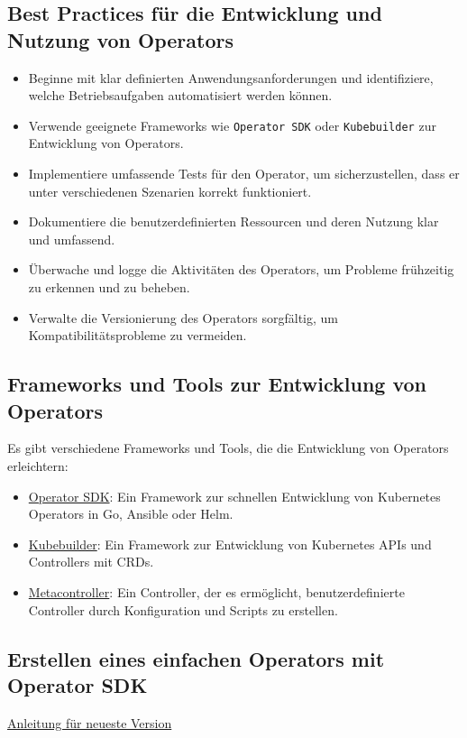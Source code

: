 \subsection{Best Practices für die Entwicklung und Nutzung von Operators}
\begin{itemize}
    \item Beginne mit klar definierten Anwendungsanforderungen und identifiziere, welche Betriebsaufgaben automatisiert werden können.
    \item Verwende geeignete Frameworks wie \texttt{Operator SDK} oder \texttt{Kubebuilder} zur Entwicklung von Operators.
    \item Implementiere umfassende Tests für den Operator, um sicherzustellen, dass er unter verschiedenen Szenarien korrekt funktioniert.
    \item Dokumentiere die benutzerdefinierten Ressourcen und deren Nutzung klar und umfassend.
    \item Überwache und logge die Aktivitäten des Operators, um Probleme frühzeitig zu erkennen und zu beheben.
    \item Verwalte die Versionierung des Operators sorgfältig, um Kompatibilitätsprobleme zu vermeiden.
\end{itemize}

\subsection{Frameworks und Tools zur Entwicklung von Operators}
Es gibt verschiedene Frameworks und Tools, die die Entwicklung von Operators erleichtern:
\begin{itemize}
    \item \href{https://sdk.operatorframework.io/}{Operator SDK}: Ein Framework zur schnellen Entwicklung von Kubernetes Operators in Go, Ansible oder Helm.
    \item \href{https://book.kubebuilder.io/}{Kubebuilder}: Ein Framework zur Entwicklung von Kubernetes APIs und Controllers mit CRDs.
    \item \href{https://metacontroller.github.io/metacontroller/}{Metacontroller}: Ein Controller, der es ermöglicht, benutzerdefinierte Controller durch Konfiguration und Scripts zu erstellen.
\end{itemize}

\subsection{Erstellen eines einfachen Operators mit Operator SDK}
\href{https://sdk.operatorframework.io/docs/installation/#install-from-github-release}{Anleitung für neueste Version}


